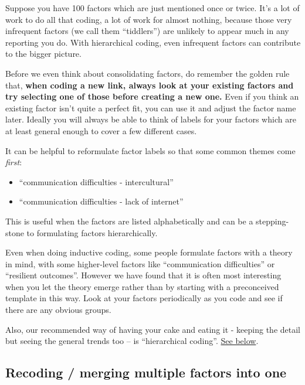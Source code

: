 \documentclass[
]{book}
\begin{document}
Suppose you have 100 factors which are just mentioned once or twice. It's a lot of work to do all that coding, a lot of work for almost nothing, because those very infrequent factors (we call them ``tiddlers'') are unlikely to appear much in any reporting you do. With hierarchical coding, even infrequent factors can contribute to the bigger picture.

Before we even think about consolidating factors, do remember the golden rule that, \textbf{when coding a new link, always look at your existing factors and try selecting one of those before creating a new one.} Even if you think an existing factor isn't quite a perfect fit, you can use it and adjust the factor name later. Ideally you will always be able to think of labels for your factors which are at least general enough to cover a few different cases.

It can be helpful to reformulate factor labels so that some common themes come \emph{first}:

\begin{itemize}
\item
  ``communication difficulties - intercultural''
\item
  ``communication difficulties - lack of internet''
\end{itemize}

This is useful when the factors are listed alphabetically and can be a stepping-stone to formulating factors hierarchically.

Even when doing inductive coding, some people formulate factors with a theory in mind, with some higher-level factors like ``communication difficulties'' or ``resilient outcomes''. However we have found that it is often most interesting when you let the theory emerge rather than by starting with a preconceived template in this way. Look at your factors periodically as you code and see if there are any obvious groups.

Also, our recommended way of having your cake and eating it - keeping the detail but seeing the general trends too -- is ``hierarchical coding''. \protect\hyperlink{simplifying-causal-maps-with-hierarchical-coding}{See below}.

\hypertarget{recoding-merging-multiple-factors-into-one}{%
\subsection{Recoding / merging multiple factors into one}\label{recoding-merging-multiple-factors-into-one}}
\end{document}

